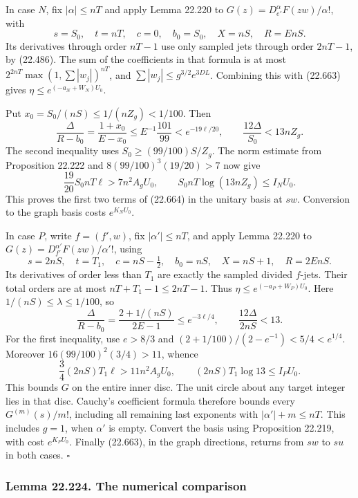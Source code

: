 \documentclass[
  11pt,
  a4paper,
]{article}
\begin{document}
In case \(N\), fix \(|\alpha|\le nT\) and apply Lemma 22.220 to
\(G(z)=D_{e'}^\alpha F(zw)/\alpha!\), with \[
 s=S_0,\quad t=nT,\quad c=0,\quad b_0=S_0,
 \quad X=nS,\quad R=EnS.
 \tag{22.665}
\] Its derivatives through order \(nT-1\) use only sampled jets through
order \(2nT-1\), by (22.486). The sum of the coefficients in that
formula is at most \(2^{2nT}\max(1,\sum|w_j|)^{nT}\), and
\(\sum|w_j|\le g^{3/2}e^{3DL}\). Combining this with (22.663) gives
\(\eta\le e^{(-a_N+W_N)U_0}\).

Put \(x_0=S_0/(nS)\le1/(nZ_g)<1/100\). Then \[
 \frac{\Delta}{R-b_0}=
 \frac{1+x_0}{E-x_0}
 \le E^{-1}\frac{101}{99}
 <e^{-19\ell/20},
 \qquad \frac{12\Delta}{S_0}<13nZ_g.
 \tag{22.666}
\] The second inequality uses \(S_0\ge(99/100)S/Z_g\). The norm estimate
from Proposition 22.222 and \(8(99/100)^3(19/20)>7\) now give \[
 \frac{19}{20}S_0nT\ell>7n^2A_gU_0,
 \qquad S_0nT\log(13nZ_g)\le I_NU_0.
 \tag{22.667}
\] This proves the first two terms of (22.664) in the unitary basis at
\(sw\). Conversion to the graph basis costs \(e^{K_NU_0}\).

In case \(P\), write \(f=(f',w)\), fix \(|\alpha'|\le nT\), and apply
Lemma 22.220 to \(G(z)=D_{f'}^{\alpha'}F(zw)/\alpha'!\), using \[
 s=2nS,\quad t=T_1,\quad c=nS-\tfrac12,
 \quad b_0=nS,\quad X=nS+1,\quad R=2EnS.
 \tag{22.668}
\] Its derivatives of order less than \(T_1\) are exactly the sampled
divided \(f\)-jets. Their total orders are at most \(nT+T_1-1\le2nT-1\).
Thus \(\eta\le e^{(-a_P+W_P)U_0}\). Here \(1/(nS)\le\lambda\le1/100\),
so \[
 \frac{\Delta}{R-b_0}
 =\frac{2+1/(nS)}{2E-1}
 \le e^{-3\ell/4},\qquad
 \frac{12\Delta}{2nS}<13.
 \tag{22.669}
\] For the first inequality, use \(e>8/3\) and
\((2+1/100)/(2-e^{-1})<5/4<e^{1/4}\). Moreover \(16(99/100)^2(3/4)>11\),
whence \[
 \frac34(2nS)T_1\ell>11n^2A_gU_0,
 \qquad (2nS)T_1\log13\le I_PU_0.
 \tag{22.670}
\] This bounds \(G\) on the entire inner disc. The unit circle about any
target integer lies in that disc. Cauchy's coefficient formula therefore
bounds every \(G^{(m)}(s)/m!\), including all remaining last exponents
with \(|\alpha'|+m\le nT\). This includes \(g=1\), when \(\alpha'\) is
empty. Convert the basis using Proposition 22.219, with cost
\(e^{K_PU_0}\). Finally (22.663), in the graph directions, returns from
\(sw\) to \(su\) in both cases. \(\square\)

\subsubsection{Lemma 22.224. The numerical
comparison}\label{lemma-22.224.-the-numerical-comparison}
\end{document}
